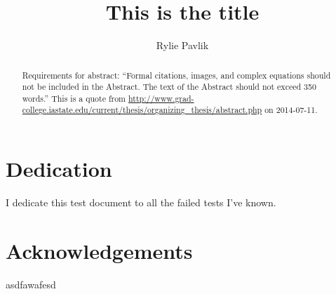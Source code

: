 \documentclass{rpisudiss}
\title{This is the title}
\author{Rylie Pavlik}
\begin{document}
\frontmatter
\maketitle
\chapter{Dedication}
I dedicate this test document to all the failed tests I've known.
\tableofcontents
\listoffigures
\listoftables
\begin{abstract}
 Requirements for abstract:
 ``Formal citations, images, and complex equations should not be included in the Abstract.
 The text of the Abstract should not exceed 350 words.''
 This is a quote from \url{http://www.grad-college.iastate.edu/current/thesis/organizing_thesis/abstract.php} on 2014-07-11.
\end{abstract}

\chapter{Acknowledgements}
asdfawafesd

\mainmatter %
\end{document}
